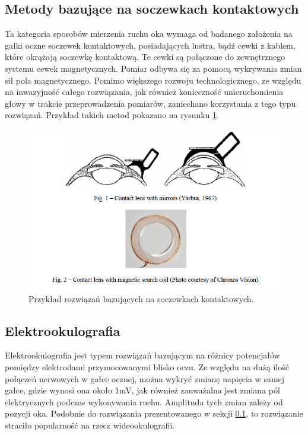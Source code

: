 \subsection{Metody bazujące na soczewkach kontaktowych}
\label{ssec:lenses}
Ta kategoria sposobów mierzenia ruchu oka wymaga od badanego założenia na gałki oczne soczewek kontaktowych, posiadających lustra, bądź cewki z kablem, które okrążają soczewkę kontaktową. Te cewki są połączone do zewnętrznego systemu cewek magnetycznych. Pomiar odbywa się za pomocą wykrywania zmian sił pola magnetycznego. Pomimo większego rozwoju technologicznego, ze względu na inwazyjność całego rozwiązania, jak również konieczność unieruchomienia głowy w trakcie przeprowadzenia pomiarów, zaniechano korzystania z tego typu rozwiązań. Przykład takich metod pokazano na rysunku \ref{fig:soczewki}.
\begin{figure}[H]
    \centering
    \captionsetup{justification=centering,margin=2cm}
    \includegraphics[width=0.9\linewidth]{resources/soczewki.png}
    \caption{Przykład rozwiązań bazujących na soczewkach kontaktowych.}
    \label{fig:soczewki}
\end{figure}
\subsection{Elektrookulografia}
\label{ssec:eog}
Elektrookulografia jest typem rozwiązań bazującym na różnicy potencjałów pomiędzy elektrodami przymocowanymi blisko oczu. Ze względu na dużą ilość połączeń nerwowych w gałce ocznej, można wykryć zmianę napięcia w samej gałce, gdzie wynosi ona około 1mV, jak również zauważalna jest zmiana pól elektrycznych podczas wykonywania ruchu. Amplituda tych zmian zależy od pozycji oka. Podobnie do rozwiązania prezentowanego w sekcji \ref{ssec:lenses}, to rozwiązanie straciło popularność na rzecz wideookulografii.
